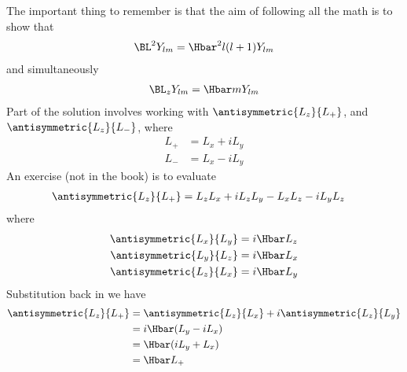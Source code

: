 %
The important thing to remember is that the aim of following all the math is to show that
%
\begin{equation}\label{eqn:lecture5BigReviewAngularMomentum:5300}
\begin{aligned}
\BL^2 Y_{lm} = \Hbar^2 l (l+1) Y_{lm}
\end{aligned}
\end{equation}
%
and simultaneously
%
\begin{equation}\label{eqn:lecture5BigReviewAngularMomentum:5320}
\begin{aligned}
\BL_z Y_{lm} = \Hbar m Y_{lm}
\end{aligned}
\end{equation}
%
Part of the solution involves working with \(\antisymmetric{L_z}{L_{+}}\), and \(\antisymmetric{L_z}{L_{-}}\), where
%
\begin{equation}\label{eqn:lecture5BigReviewAngularMomentum:5340}
\begin{aligned}
L_{+} &= L_x + i L_y \\
L_{-} &= L_x - i L_y
\end{aligned}
\end{equation}
%
An exercise (not in the book) is to evaluate
\begin{equation}\label{eqn:PHY356F:4000}
\begin{aligned}
\antisymmetric{L_z}{L_{+}}
&= L_z L_x + i L_z L_y - L_x L_z - i L_y L_z
\end{aligned}
\end{equation}
%
where
\begin{equation}\label{eqn:PHY356F:5000}
\begin{aligned}
\antisymmetric{L_x}{L_y}  &= i \Hbar L_z \\
\antisymmetric{L_y}{L_z}  &= i \Hbar L_x \\
\antisymmetric{L_z}{L_x}  &= i \Hbar L_y
\end{aligned}
\end{equation}
%
Substitution back in  we have
%
\begin{equation}\label{eqn:lecture5BigReviewAngularMomentum:5360}
\begin{aligned}
\antisymmetric{L_z}{L_{+}}
&=
\antisymmetric{L_z}{L_x}
+ i \antisymmetric{L_z}{L_y}  \\
&=
i \Hbar ( L_y - i L_x ) \\
&=
\Hbar ( i L_y +  L_x ) \\
&=
\Hbar L_{+}
\end{aligned}
\end{equation}
